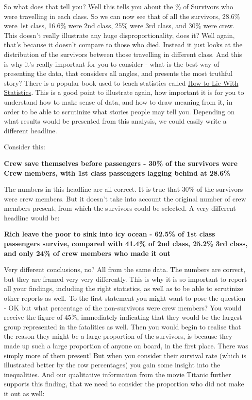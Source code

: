 \documentclass[
]{book}
\begin{document}
So what does that tell you? Well this tells you about the \% of Survivors who were travelling in each class. So we can now see that of all the survivors, 28.6\% were 1st class, 16.6\% were 2nd class, 25\% were 3rd class, and 30\% were crew. This doesn't really illustrate any huge disproportionality, does it? Well again, that's because it doesn't compare to those who died. Instead it just looks at the distribution of the survivors between those travelling in different class. And this is why it's really important for you to consider - what is the best way of presenting the data, that considers all angles, and presents the most truthful story? There is a popular book used to teach statistics called \href{https://en.wikipedia.org/wiki/How_to_Lie_with_Statistics}{How to Lie With Statistics}. This is a good point to illustrate again, how important it is for you to understand how to make sense of data, and how to draw meaning from it, in order to be able to scrutinize what stories people may tell you. Depending on what results would be presented from this analysis, we could easily write a different headline.

Consider this:

\textbf{Crew save themselves before passengers - 30\% of the survivors were Crew members, with 1st class passengers lagging behind at 28.6\%}

The numbers in this headline are all correct. It is true that 30\% of the survivors were crew members. But it doesn't take into account the original number of crew members present, from which the survivors could be selected. A very different headline would be:

\textbf{Rich leave the poor to sink into icy ocean - 62.5\% of 1st class passengers survive, compared with 41.4\% of 2nd class, 25.2\% 3rd class, and only 24\% of crew members who made it out}

Very different conclusions, no? All from the same data. The numbers are correct, but they are framed very very differently. This is why it is so important to report all your findings, including the right statistics, as well as to be able to scrutinize other reports as well. To the first statement you might want to pose the question - OK but what percentage of the non-survivors were crew members? You would receive the figure of 45\%, immediately indicating that they would be the largest group represented in the fatalities as well. Then you would begin to realise that the reason they might be a large proportion of the survivors, is because they made up such a large proportion of anyone on board, in the first place. There was simply more of them present! But when you consider their survival rate (which is illustrated better by the row percentages) you gain some insight into the inequalities. And our qualitative information from the movie Titanic further supports this finding, that we need to consider the proportion who did not make it out as well:
\end{document}
